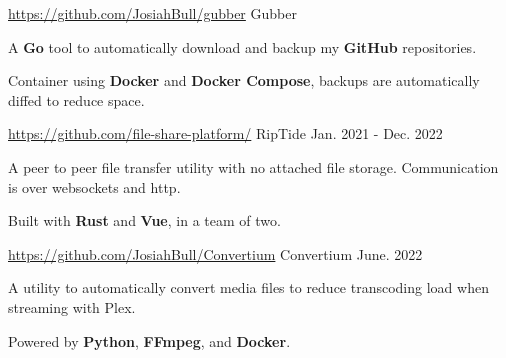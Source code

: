 
\begin{cventries}
  \cventry
    {\href{https://github.com/JosiahBull/gubber}{\faLink \space https://github.com/JosiahBull/gubber}}
    {Gubber}
    {}
    {} %
    {
      \begin{cvitems}
        \item {A \textbf{Go} tool to automatically download and backup my \textbf{GitHub} repositories.}
        \item {Container using \textbf{Docker} and \textbf{Docker Compose}, backups are automatically diffed to reduce space.}
      \end{cvitems}
    }

  \cventry
    {\href{https://github.com/file-share-platform}{\faLink \space https://github.com/file-share-platform/}} %
    {RipTide} %
    {} %
    {Jan. 2021 - Dec. 2022} %
    {
      \begin{cvitems} %
        \item {A peer to peer file transfer utility with no attached file storage. Communication is over websockets and http.}
        \item {Built with \textbf{Rust} and \textbf{Vue}, in a team of two.}
      \end{cvitems}
    }

  \cventry
  {\href{https://github.com/JosiahBull/Convertium}{\faLink \space https://github.com/JosiahBull/Convertium}} %
  {Convertium} %
  {} %
  {June. 2022} %
  {
    \begin{cvitems} %
      \item {A utility to automatically convert media files to reduce transcoding load when streaming with Plex.}
      \item {Powered by \textbf{Python}, \textbf{FFmpeg}, and \textbf{Docker}.}
    \end{cvitems}
  }


\end{cventries}

